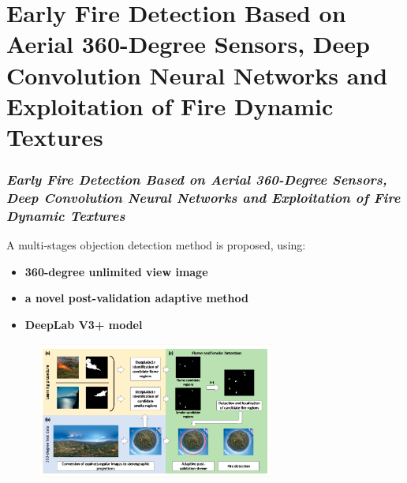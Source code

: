 \section{Early Fire Detection Based on Aerial 360-Degree Sensors,
Deep Convolution Neural Networks and Exploitation of Fire Dynamic Textures}

\begin{frame}
    \frametitle{\textit{Early Fire Detection Based on Aerial 360-Degree Sensors,
    Deep Convolution Neural Networks and Exploitation of Fire Dynamic Textures}}

    \Large 
    A multi-stages objection detection method is proposed, using:
    \normalsize
    \begin{itemize}
        \item \textbf{360-degree unlimited view image}
        \item \textbf{a novel post-validation adaptive method }
        \item \textbf{DeepLab V3+ model}
    \end{itemize}

    \begin{figure}[H]
        \centering
        \includegraphics[width=0.7\textwidth]{./imgs/proposed_process}
    \end{figure}

\end{frame}

